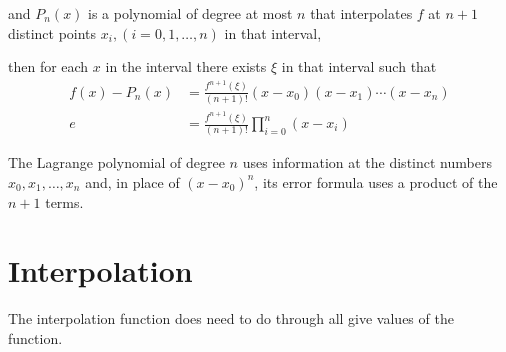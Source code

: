 \documentclass[12pt]{article}
\begin{document}
and $P_{n}(x)$ is a polynomial of degree at most $n$ that interpolates $f$ at $n + 1$ distinct points ${x_i}, (i=0,1,\dots,n)$ in that interval,

then for each $x$ in the interval there exists $\xi$  in that interval such that
\begin{align}
f(x) - P_n(x) &= \frac{f^{n+1}(\xi)}{(n+1)!}(x-x_0)(x-x_1)\cdots(x-x_n) \\
e &= \frac{f^{n+1}(\xi)}{(n+1)!}\prod_{i=0}^n (x-x_i)
\end{align}

The Lagrange polynomial of degree $n$ uses information at the
distinct numbers $x_0, x_1,\dots, x_n$ and, in place of $(x-x_0)^n$, its error formula uses a product of the $n+1$ terms.

\section{Interpolation}
The interpolation function does need to do
through all give values of the function.

%
% 
\end{document}
